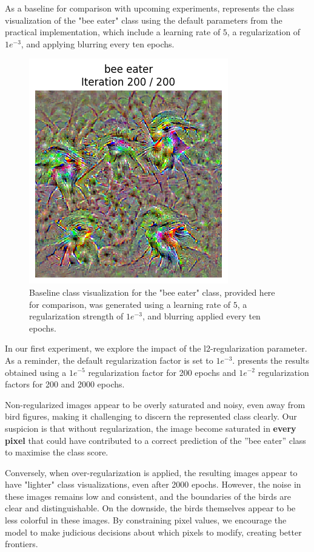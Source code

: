 As a baseline for comparison with upcoming experiments,  represents the class visualization of the "bee eater" class using the default parameters from the practical implementation, which include a learning rate of $5$, a regularization of $1e^{-3}$, and applying blurring every ten epochs.
\begin{figure}[H]
    \centering
    \includegraphics[width=.35\textwidth]{figs_propre2/SqueezeNet/SqueezeNet_bird_animated_last_frame.png}
    \caption{Baseline class visualization for the "bee eater" class, provided here for comparison, was generated using a learning rate of $5$, a regularization strength of $1e^{-3}$, and blurring applied every ten epochs.}
    \label{fig:class_viz_baseline}
\end{figure}%

In our first experiment, we explore the impact of the l2-regularization parameter. As a reminder, the default regularization factor is set to $1e^{-3}$.  presents the results obtained using a $1e^{-5}$ regularization factor for 200 epochs and $1e^{-2}$ regularization factors for 200 and 2000 epochs.

Non-regularized images appear to be overly saturated and noisy, even away from bird figures, making it challenging to discern the represented class clearly. Our suspicion is that without regularization, the image become saturated in \textbf{every pixel} that could have contributed to a correct prediction of the ''bee eater'' class to maximise the class score.

Conversely, when over-regularization is applied, the resulting images appear to have "lighter" class visualizations, even after 2000 epochs. However, the noise in these images remains low and consistent, and the boundaries of the birds are clear and distinguishable. On the downside, the birds themselves appear to be less colorful in these images. By constraining pixel values, we encourage the model to make judicious decisions about which pixels to modify, creating better frontiers.

